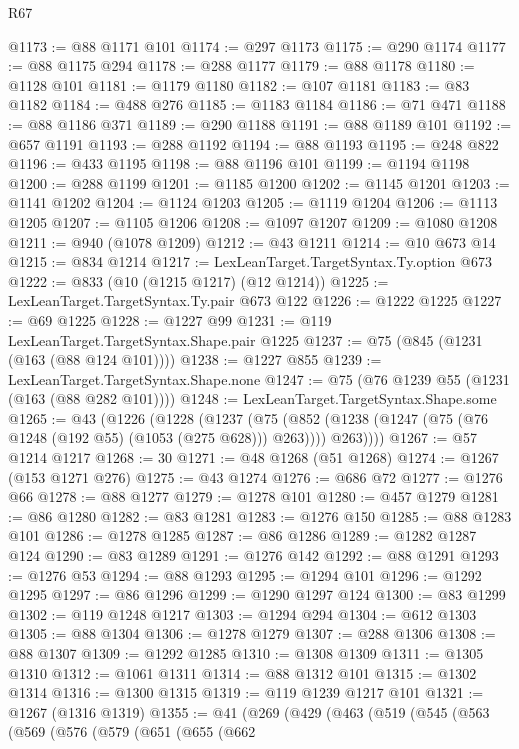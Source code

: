 \begin{lexlean}{R67}
\begin{coremodule}
@1173 := @88 @1171 @101
@1174 := @297 @1173
@1175 := @290 @1174
@1177 := @88 @1175 @294
@1178 := @288 @1177
@1179 := @88 @1178
@1180 := @1128 @101
@1181 := @1179 @1180
@1182 := @107 @1181
@1183 := @83 @1182
@1184 := @488 @276
@1185 := @1183 @1184
@1186 := @71 @471
@1188 := @88 @1186 @371
@1189 := @290 @1188
@1191 := @88 @1189 @101
@1192 := @657 @1191
@1193 := @288 @1192
@1194 := @88 @1193
@1195 := @248 @822
@1196 := @433 @1195
@1198 := @88 @1196 @101
@1199 := @1194 @1198
@1200 := @288 @1199
@1201 := @1185 @1200
@1202 := @1145 @1201
@1203 := @1141 @1202
@1204 := @1124 @1203
@1205 := @1119 @1204
@1206 := @1113 @1205
@1207 := @1105 @1206
@1208 := @1097 @1207
@1209 := @1080 @1208
@1211 := @940 (@1078 @1209)
@1212 := @43 @1211
@1214 := @10 @673 @14
@1215 := @834 @1214
@1217 := LexLeanTarget.TargetSyntax.Ty.option @673
@1222 := @833 (@10 (@1215 @1217) (@12 @1214))
@1225 := LexLeanTarget.TargetSyntax.Ty.pair @673 @122
@1226 := @1222 @1225
@1227 := @69 @1225
@1228 := @1227 @99
@1231 := @119 LexLeanTarget.TargetSyntax.Shape.pair @1225
@1237 := @75 (@845 (@1231 (@163 (@88 @124 @101))))
@1238 := @1227 @855
@1239 := LexLeanTarget.TargetSyntax.Shape.none
@1247 := @75 (@76 @1239 @55 (@1231 (@163 (@88 @282 @101))))
@1248 := LexLeanTarget.TargetSyntax.Shape.some
@1265 := @43
    (@1226
      (@1228
        (@1237
          (@75 (@852 (@1238 (@1247 (@75 (@76 @1248 (@192 @55) (@1053 (@275 @628))) @263)))) @263))))
@1267 := @57 @1214 @1217
@1268 := 30
@1271 := @48 @1268 (@51 @1268)
@1274 := @1267 (@153 @1271 @276)
@1275 := @43 @1274
@1276 := @686 @72
@1277 := @1276 @66
@1278 := @88 @1277
@1279 := @1278 @101
@1280 := @457 @1279
@1281 := @86 @1280
@1282 := @83 @1281
@1283 := @1276 @150
@1285 := @88 @1283 @101
@1286 := @1278 @1285
@1287 := @86 @1286
@1289 := @1282 @1287 @124
@1290 := @83 @1289
@1291 := @1276 @142
@1292 := @88 @1291
@1293 := @1276 @53
@1294 := @88 @1293
@1295 := @1294 @101
@1296 := @1292 @1295
@1297 := @86 @1296
@1299 := @1290 @1297 @124
@1300 := @83 @1299
@1302 := @119 @1248 @1217
@1303 := @1294 @294
@1304 := @612 @1303
@1305 := @88 @1304
@1306 := @1278 @1279
@1307 := @288 @1306
@1308 := @88 @1307
@1309 := @1292 @1285
@1310 := @1308 @1309
@1311 := @1305 @1310
@1312 := @1061 @1311
@1314 := @88 @1312 @101
@1315 := @1302 @1314
@1316 := @1300 @1315
@1319 := @119 @1239 @1217 @101
@1321 := @1267 (@1316 @1319)
@1355 := @41
    (@269
      (@429
        (@463
          (@519
            (@545
              (@563
                (@569
                  (@576
                    (@579
                      (@651
                        (@655
                          (@662

\end{coremodule}
\end{lexlean}
